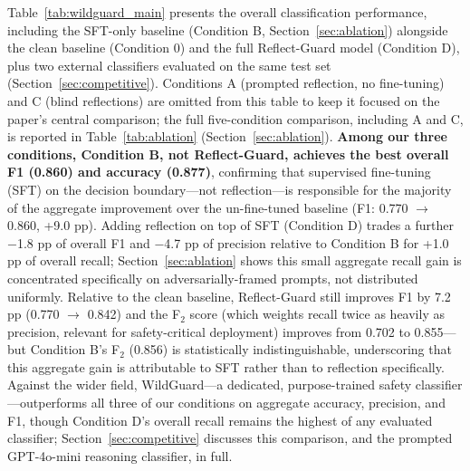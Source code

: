 \documentclass[Superintelligence,article,submit,pdftex,moreauthors]{Definitions/mdpi}
\begin{document}
Table~\ref{tab:wildguard_main} presents the overall classification performance, including the SFT-only baseline (Condition B, Section~\ref{sec:ablation}) alongside the clean baseline (Condition 0) and the full Reflect-Guard model (Condition D), plus two external classifiers evaluated on the same test set (Section~\ref{sec:competitive}). Conditions A (prompted reflection, no fine-tuning) and C (blind reflections) are omitted from this table to keep it focused on the paper's central comparison; the full five-condition comparison, including A and C, is reported in Table~\ref{tab:ablation} (Section~\ref{sec:ablation}). \textbf{Among our three conditions, Condition B, not Reflect-Guard, achieves the best overall F1 (0.860) and accuracy (0.877)}, confirming that supervised fine-tuning (SFT) on the decision boundary---not reflection---is responsible for the majority of the aggregate improvement over the un-fine-tuned baseline (F1: 0.770 $\to$ 0.860, +9.0 pp). Adding reflection on top of SFT (Condition D) trades a further $-$1.8 pp of overall F1 and $-$4.7 pp of precision relative to Condition B for +1.0 pp of overall recall; Section~\ref{sec:ablation} shows this small aggregate recall gain is concentrated specifically on adversarially-framed prompts, not distributed uniformly. Relative to the clean baseline, Reflect-Guard still improves F1 by 7.2 pp (0.770 $\to$ 0.842) and the F$_2$ score (which weights recall twice as heavily as precision, relevant for safety-critical deployment) improves from 0.702 to 0.855---but Condition B's F$_2$ (0.856) is statistically indistinguishable, underscoring that this aggregate gain is attributable to SFT rather than to reflection specifically. Against the wider field, WildGuard---a dedicated, purpose-trained safety classifier---outperforms all three of our conditions on aggregate accuracy, precision, and F1, though Condition D's overall recall remains the highest of any evaluated classifier; Section~\ref{sec:competitive} discusses this comparison, and the prompted GPT-4o-mini reasoning classifier, in full.
\end{document}
